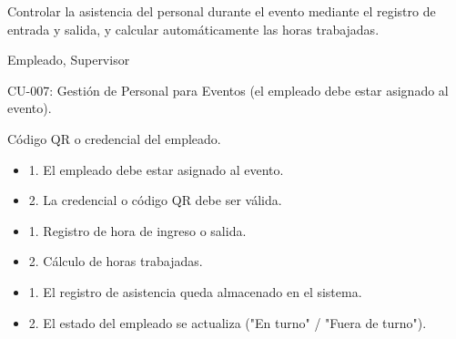 \begin{description}[leftmargin=!, labelwidth=3.4cm, style=nextline, topsep=3pt]
\item[Objetivo] Controlar la asistencia del personal durante el evento mediante el registro de entrada y salida, y calcular automáticamente las horas trabajadas.

\item[Actores] Empleado, Supervisor

\item[CU relacionados] CU-007: Gestión de Personal para Eventos (el empleado debe estar asignado al evento).

\item[Entradas] Código QR o credencial del empleado.

\item[Pre-condiciones] \hfill
\begin{itemize}[leftmargin=1.2em, topsep=1pt]
  \item 1. El empleado debe estar asignado al evento.
  \item 2. La credencial o código QR debe ser válida.
\end{itemize}

\item[Salidas] \hfill
\begin{itemize}[leftmargin=1.2em, topsep=1pt]
  \item 1. Registro de hora de ingreso o salida.
  \item 2. Cálculo de horas trabajadas.
\end{itemize}

\item[Post-condiciones] \hfill
\begin{itemize}[leftmargin=1.2em, topsep=1pt]
  \item 1. El registro de asistencia queda almacenado en el sistema.
  \item 2. El estado del empleado se actualiza ("En turno" / "Fuera de turno").
\end{itemize}

\end{description}

